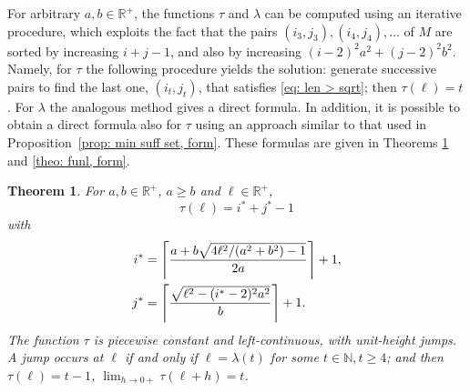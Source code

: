 \documentclass[12pt, a4paper]{article}
\let\Re\relax %
\DeclareMathOperator{\Re}{Re} %
\newcommand{\funt}{\tau} %
\newcommand{\funl}{\lambda} %
\newcommand{\len}{\ell} %
\newcommand{\tiles}{t} %
\newcommand{\isoli}{i^\ast}
\newcommand{\jsoli}{j^\ast}
\newcommand{\mss}{M}
\newtheorem{theorem}{Theorem}%
\begin{document}
For arbitrary $a, b \in \mathbb R^+$, the functions $\funt$ and $\funl$ can be computed using an iterative procedure, which exploits the fact that the pairs $(i_3,j_3), (i_4,j_4), \ldots$ of $\mss$ are sorted by increasing $i+j-1$, and also by increasing $(i-2)^2 a^2 + (j-2)^2 b^2$. Namely, for $\funt$ the following procedure yields the solution: generate successive pairs to find the last one, $(i_\tiles,j_\tiles)$, that satisfies \eqref{eq: len > sqrt}; then $\funt(\len) = \tiles$. For $\funl$ the analogous method gives a direct formula. In addition, it is possible to obtain a direct formula also for $\funt$ using an approach similar to that used in Proposition~\ref{prop: min suff set, form}. These formulas are given in Theorems \ref{theo: funt, form} and \ref{theo: funl, form}.

\begin{theorem}
\label{theo: funt, form}
For $a, b \in \mathbb R^+$, $a \geq b$ and $\len \in \mathbb R^+$,
\begin{equation}
\label{eq: theo: funt, form; funt}
\funt(\len) = \isoli+\jsoli-1
\end{equation}
with
\begin{align}
\label{eq: theo: funt, form; i}
\isoli &= \left\lceil \frac{a + b \Re \sqrt{4\len^2/(a^2+b^2)-1}}{2a} \right\rceil + 1, \\
\label{eq: theo: funt, form; j}
\jsoli &= \left\lceil \frac{\sqrt{\len^2-(\isoli-2)^2a^2}}{b} \right\rceil + 1.
\end{align}
The function $\funt$ is piecewise constant and left-continuous, with unit-height jumps. A jump occurs at $\len$ if and only if $\len = \funl(\tiles)$ for some $\tiles \in \mathbb N, \tiles \geq 4$; and then $\funt(\len) = \tiles-1$, $\lim_{h \rightarrow 0+} \funt(\len+h) = \tiles$.
\end{theorem}
\end{document}
